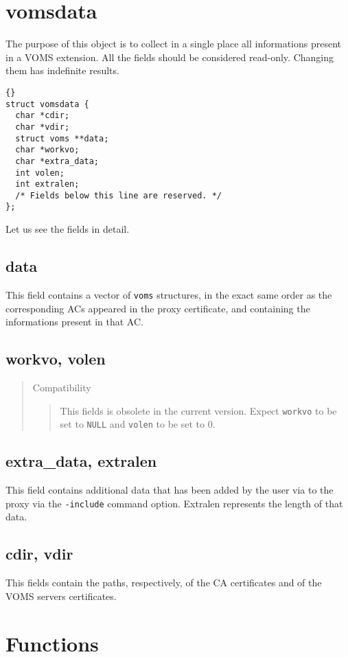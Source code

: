 \documentclass[a4paper]{book}
\newenvironment{compatibility}{\begin{quote}\color{red}Compatibility\begin{quote}}{\end{quote}\color{black}\end{quote}}
\begin{document}
\section{vomsdata}
The purpose of this object is to collect in a single place all
informations present in a VOMS extension.  All the fields should be
considered read-only.  Changing them has indefinite results.

{\begin{lstlisting}{}
struct vomsdata {
  char *cdir;
  char *vdir;
  struct voms **data;
  char *workvo;
  char *extra_data;
  int volen;
  int extralen;
  /* Fields below this line are reserved. */
};
\end{lstlisting}}

Let us see the fields in detail.

\subsection{data}
This field contains a vector of \verb|voms| structures, in the exact
same order as the corresponding ACs appeared in the proxy certificate,
and containing the informations present in that AC.

\subsection{workvo, volen}
\begin{compatibility}
This fields is obsolete in the current version.  Expect \verb|workvo|
to be set to \verb|NULL| and \verb|volen| to be set to 0.
\end{compatibility}

\subsection{extra\_data, extralen}
This field contains additional data that has been added by the user
via to the proxy via the \verb|-include| command option.  Extralen
represents the length of that data.

\subsection{cdir, vdir}
This fields contain the paths, respectively, of the CA certificates
and of the VOMS servers certificates.


\section{Functions}
\end{document}

